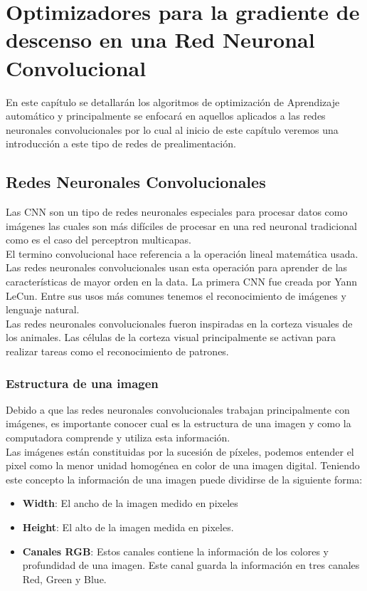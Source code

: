 \chapter{Optimizadores para la gradiente de descenso en una Red Neuronal Convolucional}
En este capítulo se detallarán los algoritmos de optimización de Aprendizaje automático y principalmente se enfocará en aquellos aplicados a las redes neuronales convolucionales por lo cual al inicio de este capítulo veremos una introducción a este tipo de redes de prealimentación.

\section{Redes Neuronales Convolucionales}
Las CNN son un tipo de redes neuronales especiales para procesar datos como imágenes las cuales son más difíciles de procesar en una red neuronal tradicional como es el caso del perceptron multicapas.\\ El termino convolucional hace referencia a la operación lineal matemática usada. Las redes neuronales convolucionales usan esta operación para aprender de las características de mayor orden en la data.
La primera CNN fue creada por Yann LeCun. Entre sus usos más comunes tenemos el reconocimiento de imágenes y lenguaje natural.\\
Las redes neuronales convolucionales fueron inspiradas en la corteza visuales de los animales. Las células de la corteza visual principalmente se activan para realizar tareas como el reconocimiento de patrones.

\subsection{Estructura de una imagen}
Debido a que las redes neuronales convolucionales trabajan principalmente con imágenes, es importante conocer cual es la estructura de una imagen y como la computadora comprende y utiliza esta información.\\
Las imágenes están constituidas por la sucesión de píxeles, podemos entender el pixel como la menor unidad homogénea en color de una imagen digital. Teniendo este concepto la información de una imagen puede dividirse de la siguiente forma:
\begin{itemize}
	\item \textbf{Width}: El ancho de la imagen medido en pixeles
	\item \textbf{Height}: El alto de la imagen medida en pixeles.
	\item \textbf{Canales RGB}: Estos canales contiene la información de los colores y profundidad de una imagen. Este canal guarda la información en tres canales Red, Green y Blue.
\end{itemize}

